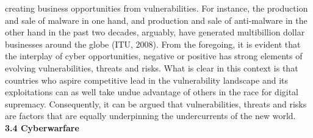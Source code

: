\documentclass[11pt,a4paper]{article}
\begin{document}
creating business opportunities from vulnerabilities. For instance, the production and sale of malware in one hand, and production and sale of anti-malware in the other hand in the past two decades, arguably, have
generated multibillion dollar businesses around the globe (ITU, 2008).
From the foregoing, it is evident that the interplay of cyber opportunities, negative or positive has strong elements of evolving vulnerabilities, threats and risks. What is clear in this context is that countries who aspire 
competitive lead in the vulnerability landscape and its exploitations can as well take undue advantage of others in the race for digital supremacy. Consequently, it can be argued that vulnerabilities, threats and risks are factors 
that are equally underpinning the undercurrents of the new world.\\

\textbf{ 3.4 Cyberwarfare }\\
\end{document}
